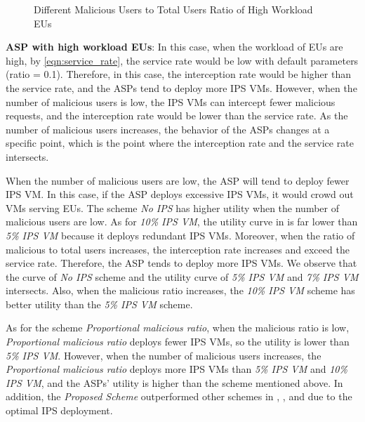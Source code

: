 \documentclass[10pt,journal, compsoc]{IEEEtran}
\begin{document}
\begin{figure}[!]
\captionsetup{justification=centering}
  \hfill
  \hfill
\label{fig:ratio_high}
\caption{Different Malicious Users to Total Users Ratio of High Workload EUs}
\end{figure}

\textbf{ASP with high workload EUs}:  In this case, when the workload of EUs are high, by \cref{eqn:service_rate}, the service rate would be low with default parameters (ratio = 0.1). Therefore, in this case, the interception rate would be higher than the service rate, and the ASPs tend to deploy more IPS VMs. However, when the number of malicious users is low, the IPS VMs can intercept fewer malicious requests, and the interception rate would be lower than the service rate. As the number of malicious users increases, the behavior of the ASPs changes at a specific point, which is the point where the interception rate and the service rate intersects. 

When the number of malicious users are low, the ASP will tend to deploy fewer IPS VM. In this case, if the ASP deploys excessive IPS VMs, it would crowd out VMs serving EUs. The scheme \textit{No IPS} has higher utility when the number of malicious users are low. As for \textit{10\% IPS VM}, the utility curve in  is far lower than \textit{5\% IPS VM} because it deploys redundant IPS VMs. Moreover, when the ratio of malicious to total users increases, the interception rate increases and exceed the service rate. Therefore, the ASP tends to deploy more IPS VMs. We observe that the curve of \textit{No IPS} scheme and the utility curve of \textit{5\% IPS VM} and \textit{7\% IPS VM} intersects. Also, when the malicious ratio increases, the \textit{10\% IPS VM} scheme has better utility than the \textit{5\% IPS VM} scheme. 

As for the scheme \textit{Proportional malicious ratio}, when the malicious ratio is low, \textit{Proportional malicious ratio} deploys fewer IPS VMs, so the utility is lower than \textit{5\% IPS VM}. However, when the number of malicious users increases, the \textit{Proportional malicious ratio} deploys more IPS VMs than \textit{5\% IPS VM} and \textit{10\% IPS VM}, and the ASPs' utility is higher than the scheme mentioned above. In addition, the \textit{Proposed Scheme} outperformed other schemes in , , and  due to the optimal IPS deployment.
\end{document}
